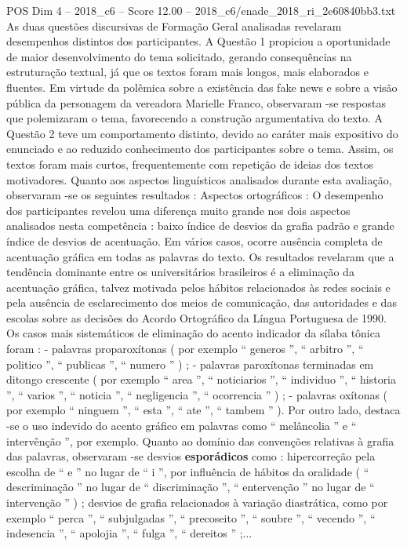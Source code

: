 \begin{textsample}{POS Dim 4 – 2018\_c6 – Score 12.00 – 2018\_c6/enade\_2018\_ri\_2e60840bb3.txt}
As duas questões discursivas de Formação Geral analisadas revelaram desempenhos distintos dos participantes.
A Questão 1 propiciou a oportunidade de maior desenvolvimento do tema solicitado, gerando consequências na estruturação textual, já que os textos foram mais longos, mais elaborados e fluentes.
Em virtude da polêmica sobre a existência das fake news e sobre a visão pública da personagem da vereadora Marielle Franco, observaram -se respostas que polemizaram o tema, favorecendo a construção argumentativa do texto.
A Questão 2 teve um comportamento distinto, devido ao caráter mais expositivo do enunciado e ao reduzido conhecimento dos participantes sobre o tema.
Assim, os textos foram mais curtos, frequentemente com repetição de ideias dos textos motivadores.
Quanto aos aspectos linguísticos analisados durante esta avaliação, observaram -se os seguintes resultados : Aspectos ortográficos : O desempenho dos participantes revelou uma diferença muito grande nos dois aspectos analisados nesta competência : baixo índice de desvios da grafia padrão e grande índice de desvios de acentuação.
Em vários casos, ocorre ausência completa de acentuação gráfica em todas as palavras do texto.
Os resultados revelaram que a tendência dominante entre os universitários brasileiros é a eliminação da acentuação gráfica, talvez motivada pelos hábitos relacionados às redes sociais e pela ausência de esclarecimento dos meios de comunicação, das autoridades e das escolas sobre as decisões do Acordo Ortográfico da Língua Portuguesa de 1990.
Os casos mais sistemáticos de eliminação do acento indicador da sílaba tônica foram : - palavras proparoxítonas ( por exemplo “ generos ”, “ arbitro ”, “ politico ”, “ publicas ”, “ numero ” ) ; - palavras paroxítonas terminadas em ditongo crescente ( por exemplo “ area ”, “ noticiarios ”, “ individuo ”, “ historia ”, “ varios ”, “ noticia ”, “ negligencia ”, “ ocorrencia ” ) ; - palavras oxítonas ( por exemplo “ ninguem ”, “ esta ”, “ ate ”, “ tambem ” ).
Por outro lado, destaca -se o uso indevido do acento gráfico em palavras como “ melâncolia ” e “ intervênção ”, por exemplo.
Quanto ao domínio das convenções relativas à grafia das palavras, observaram -se desvios \textbf{esporádicos} como : hipercorreção pela escolha de “ e ” no lugar de “ i ”, por influência de hábitos da oralidade ( “ descriminação ” no lugar de “ discriminação ”, “ entervenção ” no lugar de “ intervenção ” ) ; desvios de grafia relacionados à variação diastrática, como por exemplo “ perca ”, “ subjulgadas ”, “ precoseito ”, “ soubre ”, “ vecendo ”, “ indesencia ”, “ apolojia ”, “ fulga ”, “ dereitos ” ;...

\end{textsample}
